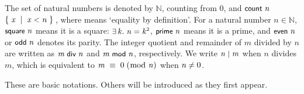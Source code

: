 \documentclass[sigplan,screen]{acmart}
\newcommand{\m}[1]{\todo[fancyline,color=blue!40,size=\scriptsize]{\textsf{JC: #1}}} %
\renewcommand{\HOLinline}[1]{\ensuremath{#1}} %
\renewcommand{\HOLConst}[1]{{\fontsize{9pt}{1em}\selectfont\textsf{\upshape #1}}}
\renewcommand{\HOLNumLit}[1]{{\selectfont\textrm{\upshape #1}}} %
\renewcommand{\HOLSymConst}[1]{{\fontsize{9pt}{1em}\selectfont\textsf{\upshape #1}}}
\renewcommand{\HOLTokenBar}{\ensuremath{\mid}}
\newcommand{\mygcd}[2]{\HOLConst{gcd}(#1,#2)}   %
\begin{document}
The set of natural numbers is denoted by $\mathbb{N}$, counting from $0$,
and \HOLinline{\HOLConst{count}\;\HOLFreeVar{n}}\;\HOLTokenDefEquality{}\;\HOLinline{\HOLTokenLeftbrace{}\HOLBoundVar{x}\;\HOLTokenBar{}\;\HOLBoundVar{x}\;\HOLSymConst{\HOLTokenLt{}}\;\HOLFreeVar{n}\HOLTokenRightbrace{}},
where \HOLTokenDefEquality{} means `equality by definition'.
For a natural number $n \in \mathbb{N}$,
\HOLinline{\HOLConst{square}\;\HOLFreeVar{n}} means it is a square: \HOLinline{\HOLSymConst{\HOLTokenExists{}}\HOLBoundVar{k}.\;\HOLFreeVar{n}\;\HOLSymConst{=}\;\HOLBoundVar{k}\HOLSymConst{\ensuremath{\sp{2}}}},
\HOLinline{\HOLConst{prime}\;\HOLFreeVar{n}} means it is a prime, and
\HOLinline{\HOLConst{\HOLConst{even}}\;\HOLFreeVar{n}} or \HOLinline{\HOLConst{\HOLConst{odd}}\;\HOLFreeVar{n}} denotes its parity.
The integer quotient and remainder of $m$ divided by $n$ are written as \HOLinline{\HOLFreeVar{m}\;\HOLConst{\HOLConst{div}}\;\HOLFreeVar{n}} and \HOLinline{\HOLFreeVar{m}\;\HOLConst{\HOLConst{mod}}\;\HOLFreeVar{n}}, respectively.
We write \HOLinline{\HOLFreeVar{n}\;\HOLConst{\ensuremath{\mid}}\;\HOLFreeVar{m}} when $n$ divides $m$,
which is equivalent to \HOLinline{\HOLFreeVar{m}\;\ensuremath{\equiv}\;\HOLNumLit{0}\;\ensuremath{(}\ensuremath{\bmod}\;\HOLFreeVar{n}\ensuremath{)}} when \HOLinline{\HOLFreeVar{n}\;\HOLSymConst{\HOLTokenNotEqual{}}\;\HOLNumLit{0}}.

These are basic notations. Others will be introduced as they first appear.

\end{document}
